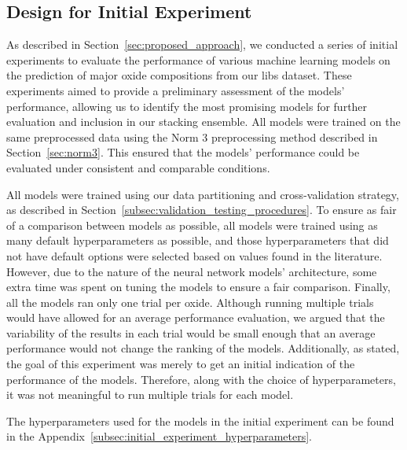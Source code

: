 \subsection{Design for Initial Experiment}\label{sec:initial-experiment}
As described in Section~\ref{sec:proposed_approach}, we conducted a series of initial experiments to evaluate the performance of various machine learning models on the prediction of major oxide compositions from our \gls{libs} dataset.
These experiments aimed to provide a preliminary assessment of the models' performance, allowing us to identify the most promising models for further evaluation and inclusion in our stacking ensemble.
All models were trained on the same preprocessed data using the Norm 3 preprocessing method described in Section~\ref{sec:norm3}.
This ensured that the models' performance could be evaluated under consistent and comparable conditions.

All models were trained using our data partitioning and cross-validation strategy, as described in Section~\ref{subsec:validation_testing_procedures}. 
To ensure as fair of a comparison between models as possible, all models were trained using as many default hyperparameters as possible, and those hyperparameters that did not have default options were selected based on values found in the literature.
However, due to the nature of the neural network models' architecture, some extra time was spent on tuning the models to ensure a fair comparison.
Finally, all the models ran only one trial per oxide. 
Although running multiple trials would have allowed for an average performance evaluation, we argued that the variability of the results in each trial would be small enough that an average performance would not change the ranking of the models. 
Additionally, as stated, the goal of this experiment was merely to get an initial indication of the performance of the models.
Therefore, along with the choice of hyperparameters, it was not meaningful to run multiple trials for each model.


The hyperparameters used for the models in the initial experiment can be found in the Appendix~\ref{subsec:initial_experiment_hyperparameters}.